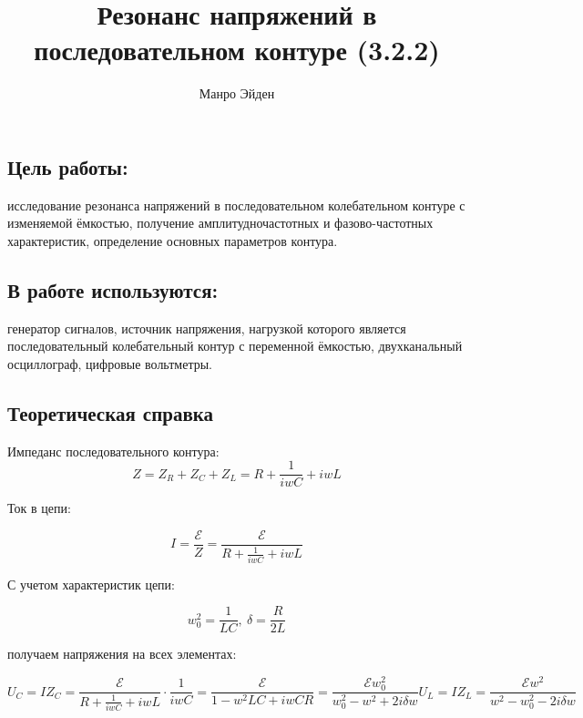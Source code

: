 \documentclass[a4paper, 12pt]{article}
\title{\textbf{Резонанс напряжений в последовательном контуре{ (3.2.2)}}}
\author{Манро Эйден}
\date{}
\begin{document}
\maketitle

\newpage

\subsection*{Цель работы:}
исследование резонанса напряжений в последовательном
колебательном контуре с изменяемой ёмкостью, получение амплитудночастотных и фазово-частотных характеристик, определение основных параметров контура.

\subsection*{В работе используются:}
генератор сигналов, источник напряжения,
нагрузкой которого является последовательный колебательный контур с
переменной ёмкостью, двухканальный осциллограф, цифровые вольтметры.

\subsection*{Теоретическая справка}

Импеданс последовательного контура:
\begin{equation}
    Z = Z_R + Z_C + Z_L = R + \frac{1}{iwC} + iwL
\end{equation}

Ток в цепи:

\begin{equation}
I = \frac{\mathcal{E}}{Z} = \frac{\mathcal{E}}{R + \frac{1}{iwC} + iwL}
\end{equation}

С учетом характеристик цепи:

\begin{equation}
    w_0^2 = \frac{1}{LC}, \ \delta = \frac{R}{2L}
\end{equation}

получаем напряжения на всех элементах:

\begin{equation}
    U_C = IZ_C = \frac{\mathcal{E}}{R + \frac{1}{iwC} + iwL} \cdot \frac{1}{iwC} = \frac{\mathcal{E}}{1 - w^2LC + iwCR} = \frac{\mathcal{E} w_0^2}{w_0^2 - w^2 + 2i\delta w}
    U_L = IZ_L = \frac{\mathcal{E} w^2}{w^2 - w_0^2 - 2i\delta w}
\end{equation}
\end{document}
